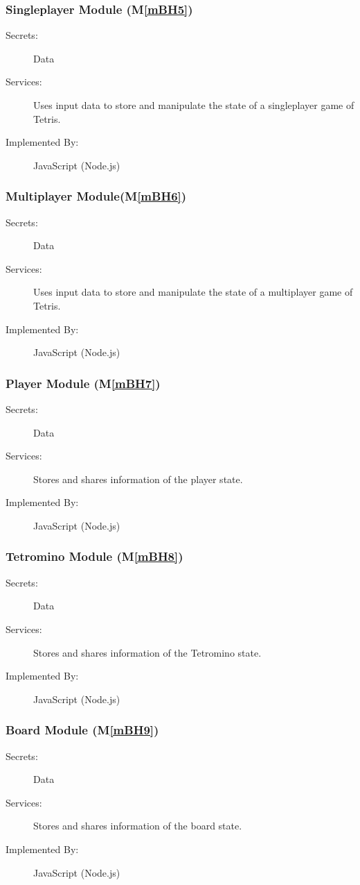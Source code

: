 \documentclass[12pt, titlepage]{article}
\newcommand{\mref}[1]{M\ref{#1}}
\begin{document}
\subsubsection{Singleplayer Module (\mref{mBH5})}
\begin{description}
\item[Secrets:]Data
\item[Services:] Uses input data to store and manipulate the state of a singleplayer game of Tetris.
\item[Implemented By:] JavaScript (Node.js)
\end{description}

\subsubsection{Multiplayer Module(\mref{mBH6})}
\begin{description}
\item[Secrets:]Data
\item[Services:]Uses input data to store and manipulate the state of a multiplayer game of Tetris.
\item[Implemented By:] JavaScript (Node.js)
\end{description}

\subsubsection{Player Module (\mref{mBH7})}
\begin{description}
\item[Secrets:]Data
\item[Services:]Stores and shares information of the player state.
\item[Implemented By:] JavaScript (Node.js)
\end{description}

\subsubsection{Tetromino Module (\mref{mBH8})}
\begin{description}
\item[Secrets:]Data
\item[Services:]Stores and shares information of the Tetromino state.
\item[Implemented By:] JavaScript (Node.js)
\end{description}

\subsubsection{Board Module (\mref{mBH9})}
\begin{description}
\item[Secrets:]Data
\item[Services:]Stores and shares information of the board state.
\item[Implemented By:] JavaScript (Node.js)
\end{description}
\end{document}
